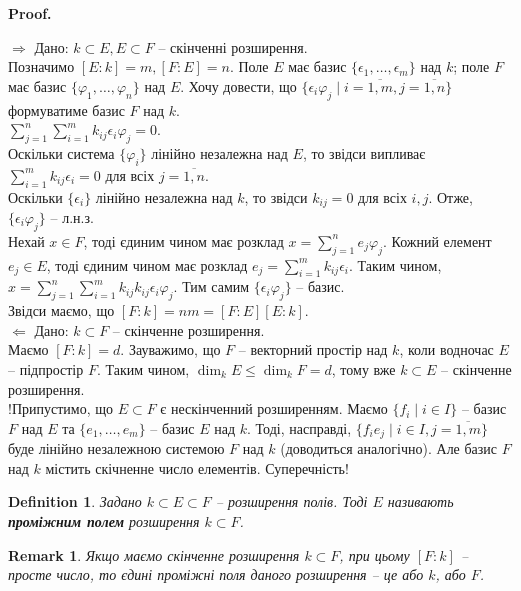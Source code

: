 \documentclass[a4paper, 10pt]{article}
\makeatletter
\def\rightproof{$\boxed{\Rightarrow}$ }
\def\leftproof{$\boxed{\Leftarrow}$ }
\theoremstyle{theoremdd}
\theoremstyle{theoremdd}
\newtheorem{definition}[theorem]{Definition}
\theoremstyle{theoremdd}
\theoremstyle{theoremdd}
\theoremstyle{theoremdd}
\theoremstyle{theoremdd}
\theoremstyle{theoremdd}
\theoremstyle{theoremdd}
\theoremstyle{theoremdd}
\theoremstyle{theoremdd}
\theoremstyle{theoremdd}
\newtheorem{remark}[theorem]{Remark}
\theoremstyle{theoremdd}
\theoremstyle{theoremdd}
\theoremstyle{theoremdd}
\theoremstyle{theoremdd}
\renewenvironment{proof}[1][Proof.\\]{\par
\pushQED{\hfill \qed}%
\normalfont \topsep6\p@\@plus6\p@\relax
\trivlist
\item\relax
{\bfseries
#1\@addpunct{.}}\hspace\labelsep\ignorespaces
}{%
\popQED\endtrivlist\@endpefalse
}
\makeatother
\begin{document}
\begin{proof}
\rightproof Дано: $k \subset E, E \subset F$ -- скінченні розширення. \\
Позначимо $[E:k] = m, [F:E] = n$. Поле $E$ має базис $\{\epsilon_1,\dots,\epsilon_m\}$ над $k$; поле $F$ має базис $\{\varphi_1,\dots,\varphi_n\}$ над $E$. Хочу довести, що $\{ \epsilon_i \varphi_j \mid i = \overline{1,m}, j = \overline{1,n} \}$ формуватиме базис $F$ над $k$.\\
$\displaystyle\sum_{j=1}^n \sum_{i=1}^m k_{ij} \epsilon_i \varphi_j = 0$.\\
Оскільки система $\{\varphi_i\}$ лінійно незалежна над $E$, то звідси випливає\\
$\displaystyle\sum_{i=1}^m k_{ij} \epsilon_i = 0$ для всіх $j = \overline{1,n}$.\\
Оскільки $\{\epsilon_i\}$ лінійно незалежна над $k$, то звідси $k_{ij} = 0$ для всіх $i,j$. Отже, $\{\epsilon_i \varphi_j\}$ -- л.н.з.\\
Нехай $x \in F$, тоді єдиним чином має розклад $x = \displaystyle\sum_{j=1}^n e_j \varphi_j$. Кожний елемент $e_j \in E$, тоді єдиним чином має розклад $e_j = \displaystyle\sum_{i=1}^m k_{ij} \epsilon_i$. Таким чином, $x = \displaystyle\sum_{j=1}^n \sum_{i=1}^m k_{ij} k_{ij} \epsilon_i \varphi_j$. Тим самим $\{\epsilon_i \varphi_j\}$ -- базис.\\
Звідси маємо, що $[F:k] = nm = [F:E][E:k]$.
\bigskip \\
\leftproof Дано: $k \subset F$ -- скінченне розширення.\\
Маємо $[F:k] = d$. Зауважимо, що $F$ -- векторний простір над $k$, коли водночас $E$ -- підпростір $F$. Таким чином, $\dim_k E \leq \dim_k F = d$, тому вже $k \subset E$ -- скінченне розширення.\\
!Припустимо, що $E \subset F$ є нескінченний розширенням. Маємо $\{f_i \mid i \in I\}$ -- базис $F$ над $E$ та $\{e_1,\dots,e_m\}$ -- базис $E$ над $k$. Тоді, насправді, $\{ f_i e_j \mid i \in I, j = \overline{1,m} \}$ буде лінійно незалежною системою $F$ над $k$ (доводиться аналогічно). Але базис $F$ над $k$ містить скічненне число елементів. Суперечність!
\end{proof}

\begin{definition}
Задано $k \subset E \subset F$ -- розширення полів. Тоді $E$ називають \textbf{проміжним полем} розширення $k \subset F$.
\end{definition}

\begin{remark}
Якщо маємо скінченне розширення $k \subset F$, при цьому $[F:k]$ -- просте число, то єдині проміжні поля даного розширення -- це або $k$, або $F$.
\end{remark}
\end{document}
